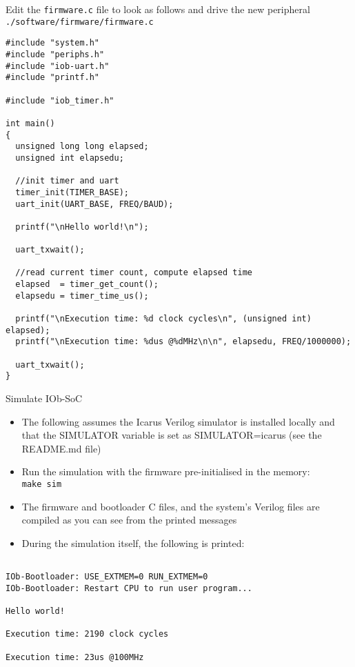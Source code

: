 \documentclass [xcolor=svgnames, t] {beamer}
\begin{document}
\begin{frame}[fragile]{Edit the {\tt firmware.c} file to look as follows and drive the new peripheral}
  {\tt ./software/firmware/firmware.c}
  \begin{tiny}
    \begin{lstlisting}
#include "system.h"
#include "periphs.h"
#include "iob-uart.h"
#include "printf.h"
      
#include "iob_timer.h"

int main()
{
  unsigned long long elapsed;
  unsigned int elapsedu;

  //init timer and uart
  timer_init(TIMER_BASE);
  uart_init(UART_BASE, FREQ/BAUD);

  printf("\nHello world!\n");
  
  uart_txwait();

  //read current timer count, compute elapsed time
  elapsed  = timer_get_count();
  elapsedu = timer_time_us();

  printf("\nExecution time: %d clock cycles\n", (unsigned int) elapsed);
  printf("\nExecution time: %dus @%dMHz\n\n", elapsedu, FREQ/1000000);

  uart_txwait();
}
    \end{lstlisting}
  \end{tiny}
\end{frame}


\begin{frame}[fragile]{Simulate IOb-SoC}
\begin{itemize}
\item The following assumes the Icarus Verilog simulator is installed locally and that the SIMULATOR variable is set as SIMULATOR=icarus (see the README.md file)
\item Run the simulation with the firmware pre-initialised in the memory:\\
  {\tt make sim}
\item The firmware and bootloader C files, and the system's Verilog files are compiled as you can see from the printed messages
\item During the simulation itself, the following is printed:
\end{itemize}

\begin{tiny}
  \begin{lstlisting}

IOb-Bootloader: USE_EXTMEM=0 RUN_EXTMEM=0
IOb-Bootloader: Restart CPU to run user program...

Hello world!

Execution time: 2190 clock cycles

Execution time: 23us @100MHz

  \end{lstlisting}
\end{tiny}
\end{frame}
\end{document}
